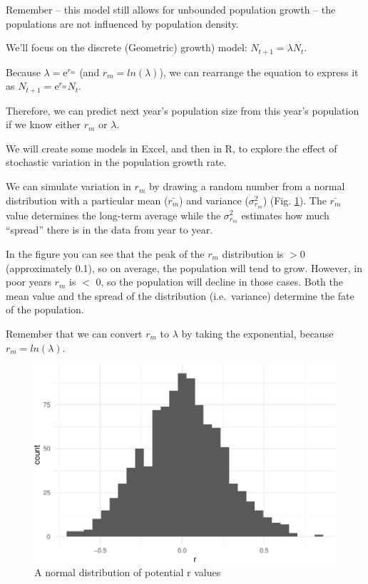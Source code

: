 \documentclass[
  a4paper]{book}
\begin{document}
Remember -- this model still allows for unbounded population growth -- the populations are not influenced by population density.

We'll focus on the discrete (Geometric) growth) model: \(N_{t+1}=\lambda N_t\).

Because \(\lambda = \mathrm{e}^{r_m}\) (and \(r_m = ln(\lambda)\)), we can rearrange the equation to express it as \(N_{t+1}=\mathrm{e}^{r_m} N_t\).

Therefore, we can predict next year's population size from this year's population if we know either \(r_m\) or \(\lambda\).

We will create some models in Excel, and then in R, to explore the effect of stochastic variation in the population growth rate.

We can simulate variation in \(r_m\) by drawing a random number from a normal distribution with a particular mean (\(\bar{r_m}\)) and variance (\(\sigma_{r_m}^2\)) (Fig. \ref{fig:stochGrowthRate}). The \(\bar{r_m}\) value determines the long-term average while the \(\sigma_{r_m}^2\) estimates how much ``spread'' there is in the data from year to year.

In the figure you can see that the peak of the \(r_m\) distribution is \(>0\) (approximately 0.1), so on average, the population will tend to grow. However, in poor years \(r_m\) is \(<\) 0, so the population will decline in those cases. Both the mean value and the spread of the distribution (i.e.~variance) determine the fate of the population.

Remember that we can convert \(r_m\) to \(\lambda\) by taking the exponential, because \(r_m = ln(\lambda)\).

\begin{figure}

{\centering \includegraphics{BB512_files/figure-latex/stochGrowthRate-1} 

}

\caption{A normal distribution of potential r values}\label{fig:stochGrowthRate}
\end{figure}
\end{document}
